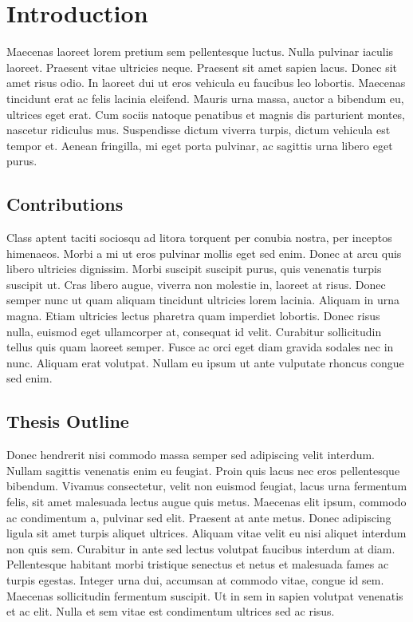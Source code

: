 \chapter{Introduction}\label{Introduction_chapter}


Maecenas laoreet lorem pretium sem pellentesque luctus. Nulla pulvinar iaculis laoreet. Praesent vitae ultricies neque. Praesent sit amet sapien lacus. Donec sit amet risus odio. In laoreet dui ut eros vehicula eu faucibus leo lobortis. Maecenas tincidunt erat ac felis lacinia eleifend. Mauris urna massa, auctor a bibendum eu, ultrices eget erat. Cum sociis natoque penatibus et magnis dis parturient montes, nascetur ridiculus mus. Suspendisse dictum viverra turpis, dictum vehicula est tempor et. Aenean fringilla, mi eget porta pulvinar, ac sagittis urna libero eget purus.

\section{Contributions}


Class aptent taciti sociosqu ad litora torquent per conubia nostra, per inceptos himenaeos. Morbi a mi ut eros pulvinar mollis eget sed enim. Donec at arcu quis libero ultricies dignissim. Morbi suscipit suscipit purus, quis venenatis turpis suscipit ut. Cras libero augue, viverra non molestie in, laoreet at risus. Donec semper nunc ut quam aliquam tincidunt ultricies lorem lacinia. Aliquam in urna magna. Etiam ultricies lectus pharetra quam imperdiet lobortis. Donec risus nulla, euismod eget ullamcorper at, consequat id velit. Curabitur sollicitudin tellus quis quam laoreet semper. Fusce ac orci eget diam gravida sodales nec in nunc. Aliquam erat volutpat. Nullam eu ipsum ut ante vulputate rhoncus congue sed enim.

\section{Thesis Outline}


Donec hendrerit nisi commodo massa semper sed adipiscing velit interdum. Nullam sagittis venenatis enim eu feugiat. Proin quis lacus nec eros pellentesque bibendum. Vivamus consectetur, velit non euismod feugiat, lacus urna fermentum felis, sit amet malesuada lectus augue quis metus. Maecenas elit ipsum, commodo ac condimentum a, pulvinar sed elit. Praesent at ante metus. Donec adipiscing ligula sit amet turpis aliquet ultrices. Aliquam vitae velit eu nisi aliquet interdum non quis sem. Curabitur in ante sed lectus volutpat faucibus interdum at diam. Pellentesque habitant morbi tristique senectus et netus et malesuada fames ac turpis egestas. Integer urna dui, accumsan at commodo vitae, congue id sem. Maecenas sollicitudin fermentum suscipit. Ut in sem in sapien volutpat venenatis et ac elit. Nulla et sem vitae est condimentum ultrices sed ac risus.

